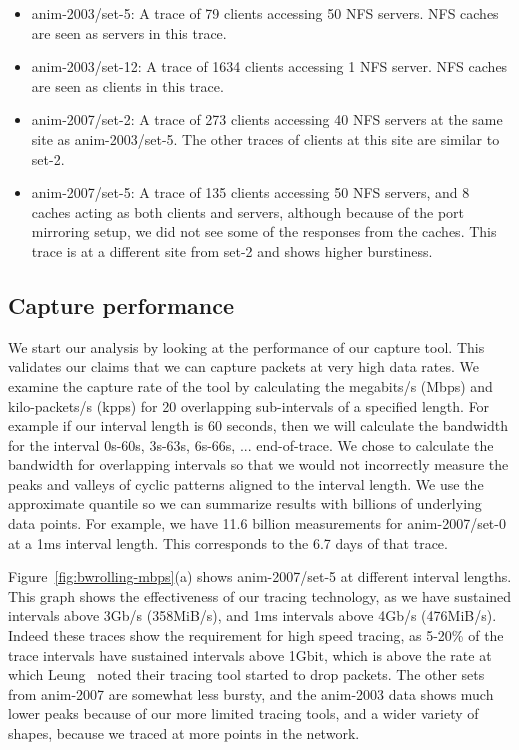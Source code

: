\begin{itemize}
\item{anim-2003/set-5}: A trace of 79 clients accessing 50 NFS servers.  
NFS caches are seen as servers in this trace.

\item{anim-2003/set-12}: A trace of 1634 clients accessing 1 NFS
server.  NFS caches are seen as clients in this trace.

\item{anim-2007/set-2}: A trace of 273 clients accessing 40 NFS
servers at the same site as anim-2003/set-5.  The other traces of
clients at this site are similar to set-2.

\item{anim-2007/set-5}: A trace of 135 clients accessing 50 NFS
servers, and 8 caches acting as both clients and servers, although
because of the port mirroring setup, we did not see some of the
responses from the caches.  This trace is at a different site from
set-2 and shows higher burstiness.
\end{itemize}

\subsection{Capture performance}

We start our analysis by looking at the performance of our capture
tool.  This validates our claims that we can capture packets at very
high data rates.  We examine the capture rate of the tool by
calculating the megabits/s (Mbps) and kilo-packets/s (kpps) for
20 overlapping sub-intervals of a specified length.  For example if our
interval length is 60 seconds, then we will calculate the bandwidth
for the interval 0s-60s, 3s-63s, 6s-66s, ... end-of-trace.  We chose
to calculate the bandwidth for overlapping intervals so that we would not
incorrectly measure the peaks and valleys of cyclic patterns aligned to the interval length.
We use the approximate quantile so we can summarize results with billions of
underlying data points.  For example, we
have 11.6 billion measurements for anim-2007/set-0 at a 1ms interval
length.  This corresponds to the 6.7 days of that trace.

Figure~\ref{fig:bwrolling-mbps}(a) shows anim-2007/set-5 at
different interval lengths.  This graph shows the effectiveness of our
tracing technology, as we have sustained intervals above 3Gb/s
(358MiB/s), and 1ms intervals above 4Gb/s (476MiB/s). Indeed these
traces show the requirement for high speed tracing, as 5-20\% of the
trace intervals have sustained intervals above 1Gbit, which is above
the rate at which Leung~\cite{LeungUsenix08} noted their tracing tool
started to drop packets.  The other sets from anim-2007 are somewhat
less bursty, and the anim-2003 data shows much lower peaks because of
our more limited tracing tools, and a wider variety of shapes, because
we traced at more points in the network.

